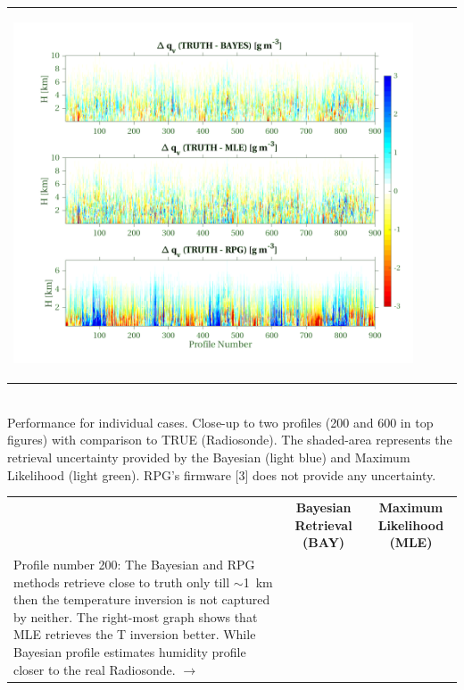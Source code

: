 \documentclass[landscape,paperwidth=1189mm,paperheight=841mm,fontscale=0.4,margin=.7cm]{baposter}
\begin{document}
\begin{poster}
{\begin{tabular}{ll|ll}
\begin{minipage}{0.35\linewidth}
		\begin{center}             
			\includegraphics[width=.99\linewidth]{QV_BAY_MLE_RPG_series.png}
		\end{center}
	\end{minipage}
\end{tabular}\\
\vspace{-0.5em}
\hline
\vspace{+1em}
{\Large Performance for individual cases. Close-up to two profiles (200 and 600 in top figures) with comparison to TRUE (Radiosonde). The shaded-area represents the retrieval uncertainty provided by the Bayesian (light blue) and Maximum Likelihood (light green). RPG's firmware [3] does not provide any uncertainty.}\\
\vspace{+2.5em}
\begin{tabular}{lcc} %
	& \textbf{\Large Bayesian Retrieval (BAY)} & \textbf{\Large Maximum Likelihood (MLE)}\\
	\begin{minipage}{0.18\linewidth}
		\colouredcircle \hspace{2em} Profile number 200: The Bayesian and RPG methods retrieve close to truth only till $\sim$1~km then the temperature inversion is not captured by neither. The right-most graph shows that MLE retrieves the T inversion better. While Bayesian profile estimates humidity profile closer to the real Radiosonde. $\rightarrow$

\end{minipage}
\end{tabular}}
\end{poster}
\end{document}
